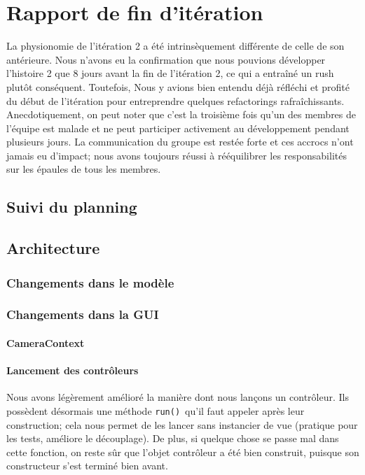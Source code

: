 \section{Rapport de fin d'itération}

La physionomie de l'itération 2 a été intrinsèquement différente de celle de son 
antérieure. Nous n'avons eu la confirmation que nous pouvions développer
l'histoire 2 que 8 jours avant la fin de l'itération 2, ce qui a entraîné un 
rush plutôt conséquent. Toutefois, Nous y avions bien entendu déjà réfléchi et 
profité du début de l'itération pour entreprendre quelques refactorings 
rafraîchissants.\\

Anecdotiquement, on peut noter que c'est la troisième fois qu'un des membres de
l'équipe est malade et ne peut participer activement au développement pendant
plusieurs jours. La communication du groupe est restée forte et ces accrocs 
n'ont jamais eu d'impact; nous avons toujours réussi à rééquilibrer les 
responsabilités sur les épaules de tous les membres.

\subsection{Suivi du planning}


\subsection{Architecture}
	
	\subsubsection{Changements dans le modèle}

	\subsubsection{Changements dans la GUI}

		\paragraph{CameraContext}

		\paragraph{Lancement des contrôleurs}
		Nous avons légèrement amélioré la manière dont nous lançons un contrôleur.
		Ils possèdent désormais une méthode \texttt{run()} qu'il faut appeler
		après leur construction; cela nous permet de les lancer sans instancier
		de vue (pratique pour les tests, améliore le découplage). De plus, si 
		quelque chose se passe mal dans cette fonction, on reste sûr que 
		l'objet contrôleur a été bien construit, puisque son constructeur s'est
		terminé bien avant. 

